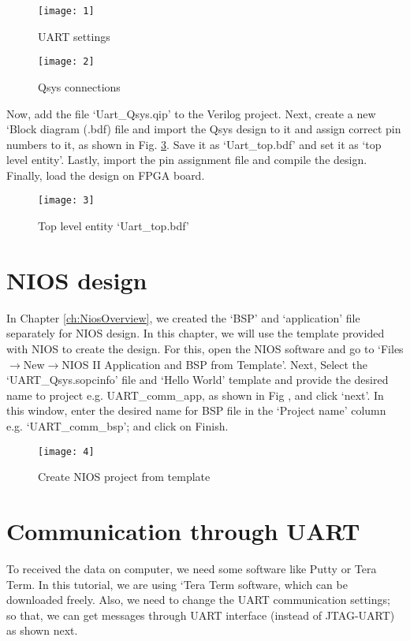 \begin{figure}[!h]
	\centering
	\texttt{[image: 1]}
	\caption{UART settings}
	\label{fig:uart_settings}
\end{figure}

\begin{figure}[!h]
	\centering
	\texttt{[image: 2]}
	\caption{Qsys connections}
	\label{fig:uart_qsys_conn}
\end{figure}

Now, add the file `Uart\_Qsys.qip' to the Verilog project. Next, create a new `Block diagram (.bdf) file and import the Qsys design to it and assign correct pin numbers to it, as shown in Fig. \ref{fig:uart_top}. Save it as `Uart\_top.bdf' and set it as `top  level entity'. Lastly, import the pin assignment file and compile the design. Finally, load the design on FPGA board. 

\begin{figure}[!h]
	\centering
	\texttt{[image: 3]}
	\caption{Top level entity `Uart\_top.bdf'}
	\label{fig:uart_top}
\end{figure}

\section{NIOS design}
In Chapter \ref{ch:NiosOverview}, we created the `BSP' and `application' file separately for NIOS design. In this chapter, we will use the template provided with NIOS to create the design. For this, open the NIOS software and go to `Files$\rightarrow$New$\rightarrow$NIOS II Application and BSP from Template'. Next, Select the `UART\_Qsys.sopcinfo' file and `Hello World' template and provide the desired name to project e.g. UART\_comm\_app, as shown in Fig , and click `next'. In this window, enter the desired name for BSP file in the `Project name' column e.g. `UART\_comm\_bsp'; and click on Finish.  

\begin{figure}[!h]
	\centering
	\texttt{[image: 4]}
	\caption{Create NIOS project from template}
	\label{fig:nios_name_uart}
\end{figure}

\section{Communication through UART}
To received the data on computer, we need some software like Putty or Tera Term. In this tutorial, we are using `Tera Term software, which can be downloaded freely. Also, we need to change the UART communication settings; so that, we can get messages through UART interface (instead of JTAG-UART)  as shown next. 

